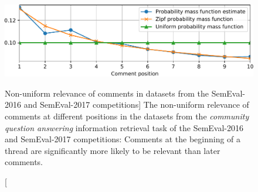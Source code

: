 \begin{figure}
\includegraphics{godwins-law}
\vspace{-0.6cm}
\caption
  [Non-uniform relevance of comments in datasets from the SemEval-2016 and
   SemEval-2017 competitions]%
  {The non-uniform relevance of comments at different positions in the datasets
   from the \emph{community question answering} information retrieval task of
   the SemEval-2016 and SemEval-2017 competitions: Comments at the beginning of
   a thread are significantly more likely to be relevant than later comments.
   \cite[Figure 2]{novotny2018weighting}}
\label{fig:weighted-zone-scoring}
\end{figure}
